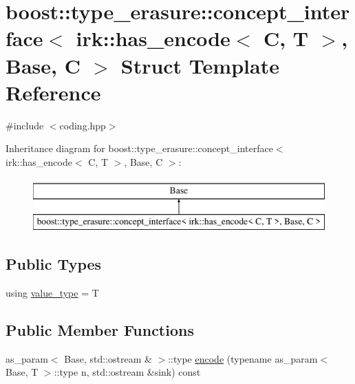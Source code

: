 \hypertarget{structboost_1_1type__erasure_1_1concept__interface_3_01irk_1_1has__encode_3_01C_00_01T_01_4_00_01Base_00_01C_01_4}{}\section{boost\+:\+:type\+\_\+erasure\+:\+:concept\+\_\+interface$<$ irk\+:\+:has\+\_\+encode$<$ C, T $>$, Base, C $>$ Struct Template Reference}
\label{structboost_1_1type__erasure_1_1concept__interface_3_01irk_1_1has__encode_3_01C_00_01T_01_4_00_01Base_00_01C_01_4}


{\ttfamily \#include $<$coding.\+hpp$>$}

Inheritance diagram for boost\+:\+:type\+\_\+erasure\+:\+:concept\+\_\+interface$<$ irk\+:\+:has\+\_\+encode$<$ C, T $>$, Base, C $>$\+:\begin{figure}[H]
\begin{center}
\leavevmode
\includegraphics[height=2.000000cm]{structboost_1_1type__erasure_1_1concept__interface_3_01irk_1_1has__encode_3_01C_00_01T_01_4_00_01Base_00_01C_01_4}
\end{center}
\end{figure}
\subsection*{Public Types}
\begin{DoxyCompactItemize}
\item 
using \mbox{\hyperlink{structboost_1_1type__erasure_1_1concept__interface_3_01irk_1_1has__encode_3_01C_00_01T_01_4_00_01Base_00_01C_01_4_a8778ea55db2033d42ecdd9f5e2d24d11}{value\+\_\+type}} = T
\end{DoxyCompactItemize}
\subsection*{Public Member Functions}
\begin{DoxyCompactItemize}
\item 
as\+\_\+param$<$ Base, std\+::ostream \& $>$\+::type \mbox{\hyperlink{structboost_1_1type__erasure_1_1concept__interface_3_01irk_1_1has__encode_3_01C_00_01T_01_4_00_01Base_00_01C_01_4_aaab1ac62febefb2752117b06067e317a}{encode}} (typename as\+\_\+param$<$ Base, T $>$\+::type n, std\+::ostream \&sink) const
\end{DoxyCompactItemize}


